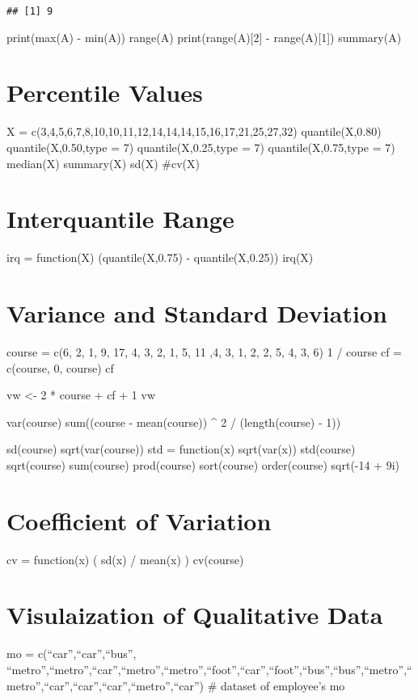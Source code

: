 \documentclass[
]{article}
\begin{document}
\begin{verbatim}
## [1] 9
\end{verbatim}

print(max(A) - min(A)) range(A) print(range(A){[}2{]} - range(A){[}1{]})
summary(A)

\section{Percentile Values}\label{percentile-values}

X = c(3,4,5,6,7,8,10,10,11,12,14,14,14,15,16,17,21,25,27,32)
quantile(X,0.80) quantile(X,0.50,type = 7) quantile(X,0.25,type = 7)
quantile(X,0.75,type = 7) median(X) summary(X) sd(X) \#cv(X)

\section{Interquantile Range}\label{interquantile-range}

irq = function(X) (quantile(X,0.75) - quantile(X,0.25)) irq(X)

\section{Variance and Standard
Deviation}\label{variance-and-standard-deviation}

course = c(6, 2, 1, 9, 17, 4, 3, 2, 1, 5, 11 ,4, 3, 1, 2, 2, 5, 4, 3, 6)
1 / course cf = c(course, 0, course) cf

vw \textless- 2 * course + cf + 1 vw

var(course) sum((course - mean(course)) \^{} 2 / (length(course) - 1))

sd(course) sqrt(var(course)) std = function(x) sqrt(var(x)) std(course)
sqrt(course) sum(course) prod(course) sort(course) order(course)
sqrt(-14 + 9i)

\section{Coefficient of Variation}\label{coefficient-of-variation}

cv = function(x) ( sd(x) / mean(x) ) cv(course)

\section{Visulaization of Qualitative
Data}\label{visulaization-of-qualitative-data}

mo = c(``car'',``car'',``bus'',
``metro'',``metro'',``car'',``metro'',``metro'',``foot'',``car'',``foot'',``bus'',``bus'',``metro'',``metro'',``car'',``car'',``car'',``metro'',``car'')
\# dataset of employee's mo
\end{document}
